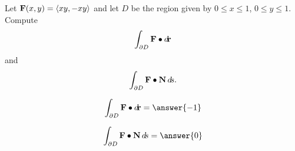 \documentclass{ximera}
\author{David Guichard \and Neal Koblitz \and H. Jerome Keisler \and Albert Scheller \and Barry Balof \and Mike Wills \and Matthew Carr}
\begin{document}
\begin{exercise}




Let $\mathbf{F}(x,y)=\left\langle xy,-xy\right\rangle$ and let $D$ be the region given by
$0\le x\le 1$, $0\le y\le 1$. Compute
\[
\int_{\partial D}\mathbf{F}\bullet\mathop{}\!d\!\mathbf{r}
\]
and
\[
\int_{\partial D}\mathbf{F}\bullet\mathbf{N}\mathop{}\!d\! s.
\]
 
\begin{prompt}
\[
\int_{\partial D}\vec{F}\dotp\d\vec{r}=\answer{-1}
\]
\end{prompt}

\begin{prompt}
\[
\int_{\partial D}\vec{F}\dotp\vec{N}\d s=\answer{0}
\]
\end{prompt}



\end{exercise}
\end{document}

